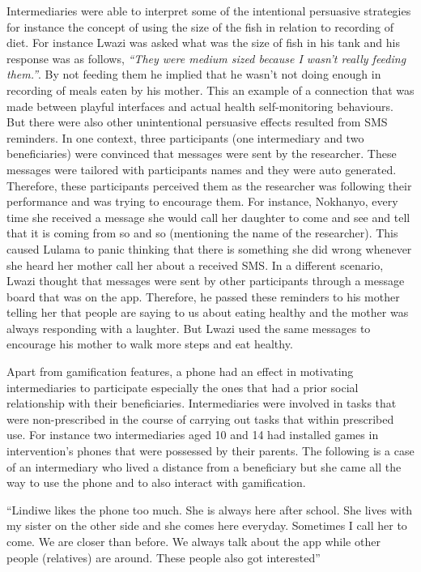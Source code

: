 Intermediaries were able to interpret some of the intentional persuasive strategies for instance the concept of using the size of the fish in relation to recording of diet. For instance Lwazi was asked what was the size of fish in his tank and his response was as follows, \emph{``They were medium sized because I wasn't really feeding them.''}. By not feeding them he implied that he wasn't not doing enough in recording of meals eaten by his mother. This an example of a connection that was made between playful interfaces and actual health self-monitoring behaviours. But there were also other unintentional persuasive effects resulted from SMS reminders. In one context, three participants (one intermediary and two beneficiaries) were convinced that messages were sent by the researcher. These messages were tailored with participants names and they were auto generated. Therefore, these participants perceived them as the researcher was following their performance and was trying to encourage them. For instance, Nokhanyo, every time she received a message she would call her daughter to come and see and tell that it is coming from so and so (mentioning the name of the researcher). This caused Lulama to panic thinking that there is something she did wrong whenever she heard her mother call her about a received SMS. In a different scenario, Lwazi thought that messages were sent by other participants through a message board that was on the app. Therefore, he passed these reminders to his mother telling her that people are saying to us about eating healthy and the mother was always responding with a laughter. But Lwazi used the same messages to encourage his mother to walk more steps and eat healthy.  

Apart from gamification features, a phone had an effect in motivating intermediaries to participate especially the ones that had a prior social relationship with their beneficiaries. Intermediaries were involved in tasks that were non-prescribed in the course of carrying out tasks that within prescribed use. For instance two intermediaries aged 10 and 14 had installed games in intervention's phones that were possessed by their parents. The following is a case of an intermediary who lived a distance from a beneficiary but she came all the way to use the phone and to also interact with gamification.  

 {``Lindiwe likes the phone too much. She is always here after school. She lives with my sister on the other side and she comes here everyday. Sometimes I call her to come. We are closer than before. We always talk about the app while other people (relatives) are around. These people also got interested''} 

